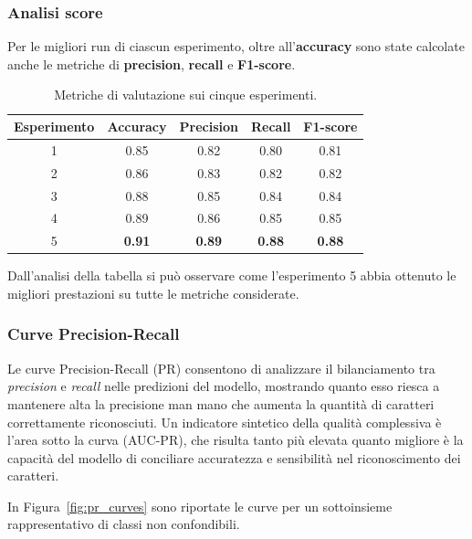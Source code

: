\subsubsection*{Analisi score}
Per le migliori run di ciascun esperimento, oltre all'\textbf{accuracy} sono state calcolate anche le metriche di \textbf{precision}, \textbf{recall} e \textbf{F1-score}.

\begin{table}[H]
\centering
\begin{tabular}{c|c|c|c|c}
\textbf{Esperimento} & \textbf{Accuracy} & \textbf{Precision} & \textbf{Recall} & \textbf{F1-score} \\
\hline
1 & 0.85 & 0.82 & 0.80 & 0.81 \\
2 & 0.86 & 0.83 & 0.82 & 0.82 \\
3 & 0.88 & 0.85 & 0.84 & 0.84 \\
4 & 0.89 & 0.86 & 0.85 & 0.85 \\
5 & \textbf{0.91} & \textbf{0.89} & \textbf{0.88} & \textbf{0.88} \\
\end{tabular}
\caption{Metriche di valutazione sui cinque esperimenti.}
\label{tab:score_analysis}
\end{table}

Dall'analisi della tabella si può osservare come l'esperimento 5 abbia ottenuto le migliori prestazioni su tutte le metriche considerate.

\subsubsection*{Curve Precision-Recall}
\label{sec:pr_curves}
Le curve Precision-Recall (PR) consentono di analizzare il bilanciamento tra \emph{precision} e \emph{recall} nelle predizioni del modello, mostrando quanto esso riesca a mantenere alta la precisione man mano che aumenta la quantità di caratteri correttamente riconosciuti. Un indicatore sintetico della qualità complessiva è l'area sotto la curva (AUC-PR), che risulta tanto più elevata quanto migliore è la capacità del modello di conciliare accuratezza e sensibilità nel riconoscimento dei caratteri.

In Figura~\ref{fig:pr_curves} sono riportate le curve per un sottoinsieme rappresentativo di classi non confondibili.

